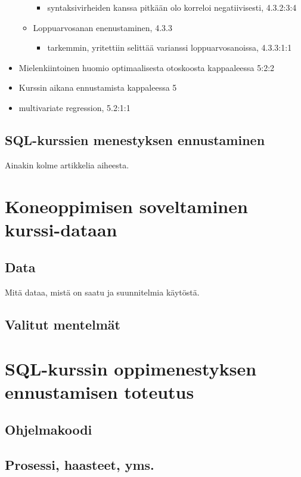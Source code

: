 \documentclass[finnish,twoside,openright]{HYgraduMLDS}
\begin{document}
\begin{itemize}
\begin{itemize}
\begin{itemize}
            \item syntaksivirheiden kanssa pitkään olo korreloi negatiivisesti, 4.3.2:3:4
        \end{itemize}
        \item Loppuarvosanan enenustaminen, 4.3.3
        \begin{itemize}
            \item tarkemmin, yritettiin selittää varianssi loppuarvosanoissa, 4.3.3:1:1
        \end{itemize}
    \end{itemize}
    \item Mielenkiintoinen huomio optimaalisesta otoskoosta kappaaleessa 5:2:2
    \item Kurssin aikana ennustamista kappaleessa 5
    \item multivariate regression, 5.2:1:1
\end{itemize}


\section{SQL-kurssien menestyksen ennustaminen}

Ainakin kolme artikkelia aiheesta.


\chapter{Koneoppimisen soveltaminen kurssi-dataan}

\section{Data}

Mitä dataa, mistä on saatu ja suunnitelmia käytöstä.


\section{Valitut mentelmät}


\chapter{SQL-kurssin oppimenestyksen ennustamisen toteutus}

\section{Ohjelmakoodi}


\section{Prosessi, haasteet, yms.}
\end{document}
